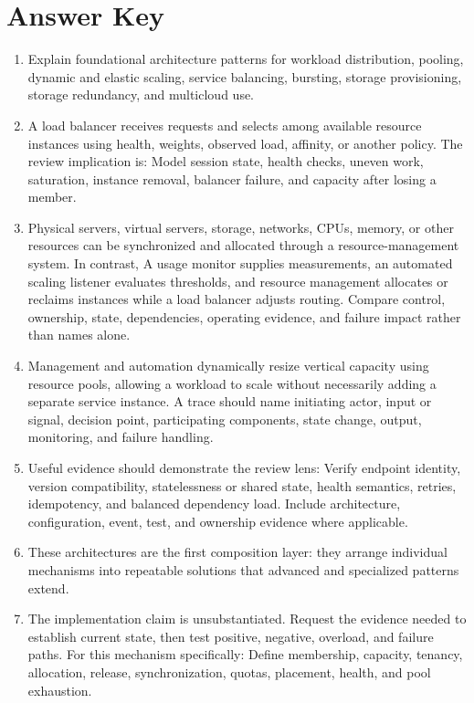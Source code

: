 \documentclass[11pt]{article}
\begin{document}
\section{Answer Key}
\begin{enumerate}
\item Explain foundational architecture patterns for workload distribution, pooling, dynamic and elastic scaling, service balancing, bursting, storage provisioning, storage redundancy, and multicloud use.
\item A load balancer receives requests and selects among available resource instances using health, weights, observed load, affinity, or another policy. The review implication is: Model session state, health checks, uneven work, saturation, instance removal, balancer failure, and capacity after losing a member.
\item Physical servers, virtual servers, storage, networks, CPUs, memory, or other resources can be synchronized and allocated through a resource-management system. In contrast, A usage monitor supplies measurements, an automated scaling listener evaluates thresholds, and resource management allocates or reclaims instances while a load balancer adjusts routing. Compare control, ownership, state, dependencies, operating evidence, and failure impact rather than names alone.
\item Management and automation dynamically resize vertical capacity using resource pools, allowing a workload to scale without necessarily adding a separate service instance. A trace should name initiating actor, input or signal, decision point, participating components, state change, output, monitoring, and failure handling.
\item Useful evidence should demonstrate the review lens: Verify endpoint identity, version compatibility, statelessness or shared state, health semantics, retries, idempotency, and balanced dependency load. Include architecture, configuration, event, test, and ownership evidence where applicable.
\item These architectures are the first composition layer: they arrange individual mechanisms into repeatable solutions that advanced and specialized patterns extend.
\item The implementation claim is unsubstantiated. Request the evidence needed to establish current state, then test positive, negative, overload, and failure paths. For this mechanism specifically: Define membership, capacity, tenancy, allocation, release, synchronization, quotas, placement, health, and pool exhaustion.

\end{enumerate}
\end{document}
